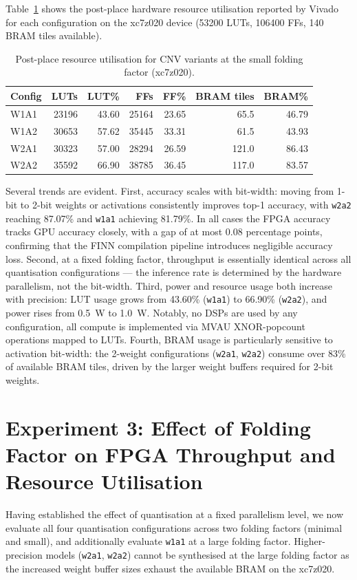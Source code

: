 \documentclass[11pt]{article}
\begin{document}
Table~\ref{tab:exp2_util} shows the post-place hardware resource utilisation reported by Vivado for each configuration on the xc7z020 device (53200 LUTs, 106400 FFs, 140 BRAM tiles available).

\begin{table}[H]
\centering
\caption{Post-place resource utilisation for CNV variants at the small folding factor (xc7z020).}
\label{tab:exp2_util}
\begin{tabular}{lrrrrrr}
\hline
\textbf{Config} & \textbf{LUTs} & \textbf{LUT\%} & \textbf{FFs} & \textbf{FF\%} & \textbf{BRAM tiles} & \textbf{BRAM\%} \\
\hline
W1A1 & 23196 & 43.60 & 25164 & 23.65 &  65.5 & 46.79 \\
W1A2 & 30653 & 57.62 & 35445 & 33.31 &  61.5 & 43.93 \\
W2A1 & 30323 & 57.00 & 28294 & 26.59 & 121.0 & 86.43 \\
W2A2 & 35592 & 66.90 & 38785 & 36.45 & 117.0 & 83.57 \\
\hline
\end{tabular}
\end{table}

Several trends are evident.
First, accuracy scales with bit-width: moving from 1-bit to 2-bit weights or activations consistently improves top-1 accuracy, with \texttt{w2a2} reaching 87.07\% and \texttt{w1a1} achieving 81.79\%. In all cases the FPGA accuracy tracks GPU accuracy closely, with a gap of at most 0.08 percentage points, confirming that the FINN compilation pipeline introduces negligible accuracy loss.
Second, at a fixed folding factor, throughput is essentially identical across all quantisation configurations — the inference rate is determined by the hardware parallelism, not the bit-width.
Third, power and resource usage both increase with precision: LUT usage grows from 43.60\% (\texttt{w1a1}) to 66.90\% (\texttt{w2a2}), and power rises from \SI{0.5}{\watt} to \SI{1.0}{\watt}.
Notably, no DSPs are used by any configuration, all compute is implemented via MVAU XNOR-popcount operations mapped to LUTs.
Fourth, BRAM usage is particularly sensitive to activation bit-width: the 2-weight configurations (\texttt{w2a1}, \texttt{w2a2}) consume over 83\% of available BRAM tiles, driven by the larger weight buffers required for 2-bit weights.
\section{Experiment 3: Effect of Folding Factor on FPGA Throughput and Resource Utilisation}\label{Experiment3}
Having established the effect of quantisation at a fixed parallelism level, we now evaluate all four quantisation configurations across two folding factors (minimal and small), and additionally evaluate \texttt{w1a1} at a large folding factor.
Higher-precision models (\texttt{w2a1}, \texttt{w2a2}) cannot be synthesised at the large folding factor as the increased weight buffer sizes exhaust the available BRAM on the xc7z020.
\end{document}

